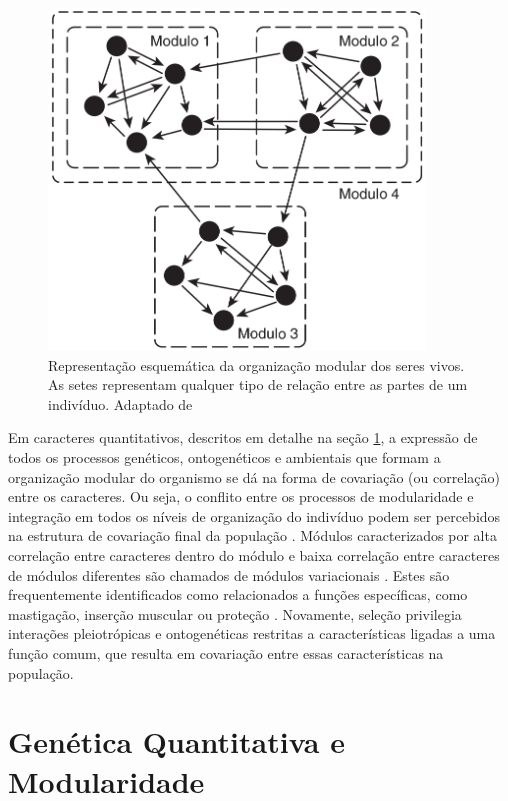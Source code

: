 \begin{figure}[h!]
  \centering
  \includegraphics[width=100mm]{figuras/modulos.png}
  \caption{Representação esquemática da organização modular dos seres
  vivos.
  As setes representam qualquer tipo de relação entre as partes
  de um indivíduo.
  Adaptado de \cite{Klingenberg2008}}
  \label{modulos}
\end{figure}

Em caracteres quantitativos, descritos em detalhe na seção
\ref{intro:genquant}, a expressão de todos os processos genéticos,
ontogenéticos e ambientais que formam a organização modular do organismo se
dá na forma de covariação (ou correlação) entre os caracteres.
Ou seja, o conflito entre os processos de modularidade e integração em todos os
níveis de organização do indivíduo podem ser percebidos na estrutura de
covariação final da população \citep{Klingenberg2008}.
Módulos caracterizados por alta correlação entre caracteres dentro do
módulo e baixa correlação entre caracteres de módulos diferentes são
chamados de módulos variacionais \citep{Wagner2007}.
Estes são frequentemente identificados como relacionados a funções
específicas, como mastigação, inserção muscular ou proteção
\citep{Cheverud1997}.
Novamente, seleção privilegia interações pleiotrópicas e ontogenéticas restritas
a características ligadas a uma função comum, que resulta em
covariação entre essas características na população.


\section{Genética Quantitativa e Modularidade}\label{intro:genquant}

